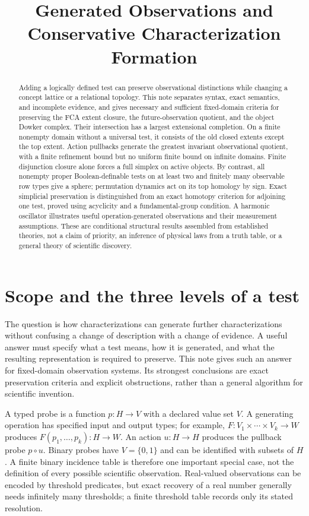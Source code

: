 \documentclass[11pt]{article}
\title{Generated Observations and Conservative Characterization Formation}
\author{}
\date{}
\theoremstyle{definition}
\begin{document}
\maketitle

\begin{abstract}
Adding a logically defined test can preserve observational distinctions while
changing a concept lattice or a relational topology. This note separates
syntax, exact semantics, and incomplete evidence, and gives necessary and
sufficient fixed-domain criteria for preserving the FCA extent closure, the
future-observation quotient, and the object Dowker complex. Their intersection
has a largest extensional completion. On a finite nonempty domain without a
universal test, it consists of the old closed extents except the top extent.
Action pullbacks generate the greatest invariant observational quotient, with
a finite refinement bound but no uniform finite bound on infinite domains.
Finite disjunction closure alone forces a full simplex on active objects.
By contrast, all nonempty proper Boolean-definable tests on at least two
and finitely many observable row types give a sphere; permutation dynamics act on its top
homology by sign. Exact simplicial preservation is distinguished from an
exact homotopy criterion for adjoining one test, proved using acyclicity and
a fundamental-group condition. A harmonic oscillator illustrates useful
operation-generated observations and their measurement assumptions. These
are conditional structural results assembled from established theories,
not a claim of priority, an inference of physical laws from a truth table,
or a general theory of scientific discovery.
\end{abstract}

\section{Scope and the three levels of a test}

The question is how characterizations can generate further characterizations
without confusing a change of description with a change of evidence. A useful
answer must specify what a test means, how it is generated, and what the
resulting representation is required to preserve. This note gives such an
answer for fixed-domain observation systems. Its strongest conclusions are
exact preservation criteria and explicit obstructions, rather than a general
algorithm for scientific invention.

A typed probe is a function $p:H\to V$ with a declared value set $V$.
A generating operation has specified input and output types; for example,
$F:V_1\times\cdots\times V_k\to W$ produces
$F(p_1,\ldots,p_k):H\to W$. An action $u:H\to H$ produces the
pullback probe $p\circ u$. Binary probes have $V=\{0,1\}$ and can be
identified with subsets of $H$. A finite binary incidence table is therefore
one important special case, not the definition of every possible scientific
observation. Real-valued observations can be encoded by threshold predicates,
but exact recovery of a real number generally needs infinitely many thresholds;
a finite threshold table records only its stated resolution.
\end{document}
